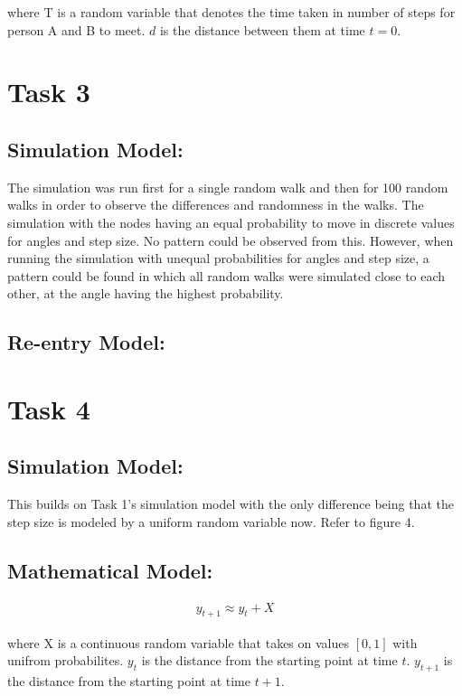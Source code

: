 \documentclass[8pt]{extarticle}
\begin{document}
where T is a random variable that denotes the time taken in number of steps for person A and B to meet.
$d$ is the distance between them at time $t = 0$.


\section*{Task 3}
\subsection*{Simulation Model:}
The simulation was run first for a single random walk and then for 100 random walks in order to observe the differences and randomness in the walks. The simulation with the nodes having an equal probability to move in discrete values for angles and step size. No pattern could be observed from this. However, when running the simulation with unequal probabilities for angles and step size, a pattern could be found in which all random walks were simulated close to each other, at the angle having the highest probability.

\subsection*{Re-entry Model:}


\section*{Task 4}
\subsection*{Simulation Model:}
This builds on Task 1's simulation model with the only difference being that the step size is modeled by a uniform random variable now.
Refer to figure 4.

\subsection*{Mathematical Model:}
\begin{align*}
    y_{t+1} \approx y_{t} + X
\end{align*}

where X is a continuous random variable that takes on values $[0, 1]$ with unifrom probabilites.
$y_t$ is the distance from the starting point at time $t$. $y_{t+1}$ is the distance from the starting point at time $t+1$.
\end{document}
